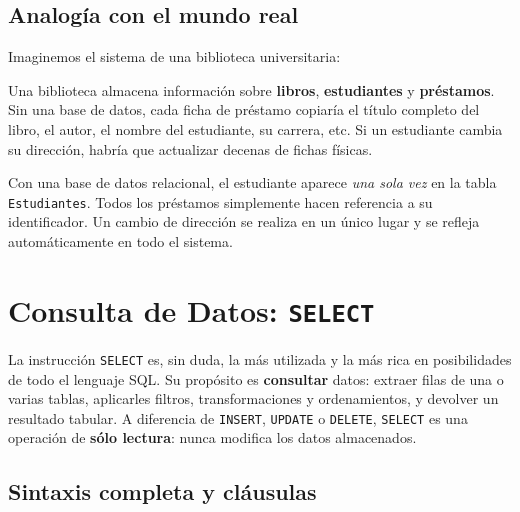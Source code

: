 \documentclass[12pt, a4paper]{article}
\begin{document}
	\subsection{Analogía con el mundo real}
	
	Imaginemos el sistema de una biblioteca universitaria:
	
	\begin{ejemplo}
		Una biblioteca almacena información sobre \textbf{libros},
		\textbf{estudiantes} y \textbf{préstamos}.
		Sin una base de datos, cada ficha de préstamo copiaría el título
		completo del libro, el autor, el nombre del estudiante, su carrera,
		etc.
		Si un estudiante cambia su dirección, habría que actualizar decenas
		de fichas físicas.
		
		Con una base de datos relacional, el estudiante aparece
		\emph{una sola vez} en la tabla \texttt{Estudiantes}.
		Todos los préstamos simplemente hacen referencia a su identificador.
		Un cambio de dirección se realiza en un único lugar y se refleja
		automáticamente en todo el sistema.
	\end{ejemplo}
	
	
	\newpage

	
	\newpage
	\section{Consulta de Datos: \texttt{SELECT}}
	
	La instrucción \texttt{SELECT} es, sin duda, la más utilizada y la
	más rica en posibilidades de todo el lenguaje SQL.
	Su propósito es \textbf{consultar} datos: extraer filas de una o
	varias tablas, aplicarles filtros, transformaciones y ordenamientos,
	y devolver un resultado tabular.
	A diferencia de \texttt{INSERT}, \texttt{UPDATE} o \texttt{DELETE},
	\texttt{SELECT} es una operación de \textbf{sólo lectura}: nunca
	modifica los datos almacenados.
	
	\subsection{Sintaxis completa y cláusulas}
	
\end{document}
